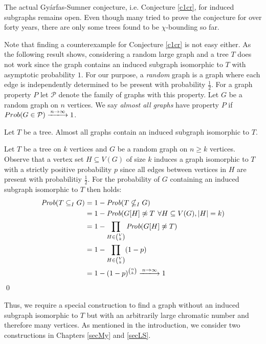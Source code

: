 The actual Gyárfas-Sumner conjecture, i.e. Conjecture \ref{c1cr}, for induced subgraphs remains open. Even though many tried to prove the conjecture for over forty years, there are only some trees found to be $\chi$-bounding so far. 

Note that finding a counterexample for Conjecture \ref{c1cr} is not easy either. As the following result shows, considering a random large graph and a tree $T$ does not work since the graph contains an induced subgraph isomorphic to $T$ with asymptotic probability $1$. For our purpose, a \textit{random} graph is a graph where each edge is independently determined to be present with probability $\frac{1}{2}$. For a graph property $P$ let $\mathcal{P}$ denote the family of graphs with this property. Let $G$ be a random graph on $n$ vertices. We say \textit{almost all graphs} have property $P$ if $Prob(G\in\mathcal{P})\xlongrightarrow{{n\to\infty}} 1$.
\begin{thm}
Let $T$ be a tree. Almost all graphs contain an induced subgraph isomorphic to $T$.
\end{thm}
\begin{prf}
Let $T$ be a tree on $k$ vertices and $G$ be a random graph on $n\geq k$ vertices. Observe that a vertex set $H\subseteq V(G)$ of size $k$ induces a graph isomorphic to $T$ with a strictly positive probability $p$ since all edges between vertices in $H$ are present with probabilitiy $\frac{1}{2}$. For the probability of $G$ containing an induced subgraph isomorphic to $T$ then holds:
\begin{equation*}
\begin{split}
\textit{Prob}(T\subseteq_I G) &= 1-\textit{Prob}(T\nsubseteq_I G)\\
&=1-\textit{Prob}(G[H]\not\approx T \hspace{0.4em}\forall H\subseteq V(G), \vert H\vert =k)\\
&=1-\prod_{H\in {V\choose k}}\textit{Prob}(G[H]\not\approx T)\\
&=1-\prod_{H\in {V\choose k}} (1-p)\\
&=1-(1-p)^{n\choose k}\xlongrightarrow{{n\to\infty}} 1
\end{split}
\end{equation*}
\qed
\end{prf}
Thus, we require a special construction to find a graph without an induced subgraph isomorphic to $T$ but with an arbitrarily large chromatic number and therefore many vertices. As mentioned in the introduction, we consider two constructions in Chapters \ref{secMy} and \ref{secLS}.

